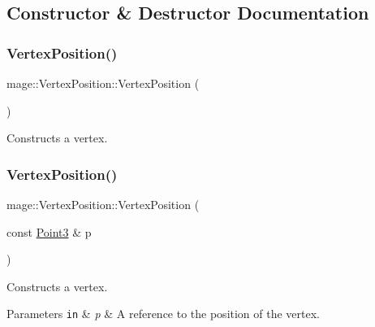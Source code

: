 \subsection{Constructor \& Destructor Documentation}
\hypertarget{structmage_1_1_vertex_position_a2e6037836e67cdf5c43fc9abfa0d3753}{}\label{structmage_1_1_vertex_position_a2e6037836e67cdf5c43fc9abfa0d3753} 
\subsubsection{\texorpdfstring{Vertex\+Position()}{VertexPosition()}\hspace{0.1cm}{\footnotesize\ttfamily [1/4]}}
{\footnotesize\ttfamily mage\+::\+Vertex\+Position\+::\+Vertex\+Position (\begin{DoxyParamCaption}{ }\end{DoxyParamCaption})\hspace{0.3cm}{\ttfamily [default]}}

Constructs a vertex. \hypertarget{structmage_1_1_vertex_position_aca7867e7a2d0cb50f32283dd91bb2aed}{}\label{structmage_1_1_vertex_position_aca7867e7a2d0cb50f32283dd91bb2aed} 
\subsubsection{\texorpdfstring{Vertex\+Position()}{VertexPosition()}\hspace{0.1cm}{\footnotesize\ttfamily [2/4]}}
{\footnotesize\ttfamily mage\+::\+Vertex\+Position\+::\+Vertex\+Position (\begin{DoxyParamCaption}\item[{const \hyperlink{structmage_1_1_point3}{Point3} \&}]{p }\end{DoxyParamCaption})\hspace{0.3cm}{\ttfamily [explicit]}}

Constructs a vertex.


\begin{DoxyParams}[1]{Parameters}
\mbox{\tt in}  & {\em p} & A reference to the position of the vertex. \\
\hline
\end{DoxyParams}
\hypertarget{structmage_1_1_vertex_position_aa77211e4b45efed3d57f3170b9df6787}{}\label{structmage_1_1_vertex_position_aa77211e4b45efed3d57f3170b9df6787} 
